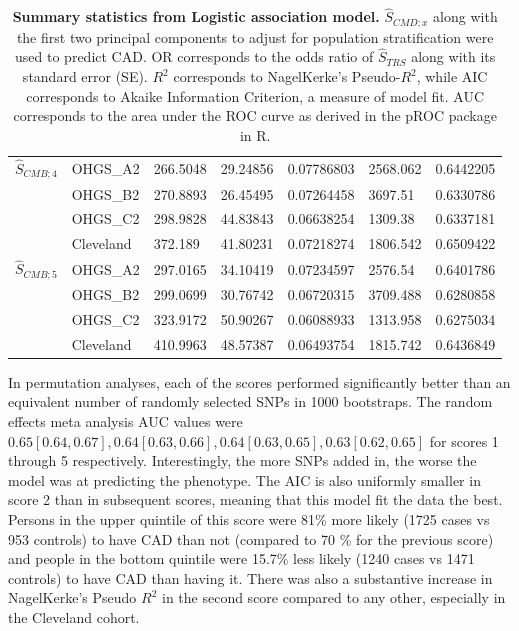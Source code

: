 \begin{table}[H]
\begin{tabular}{lllllll}
$\hat{S}_{CMB; 4}$     & OHGS\_A2         & 266.5048  & 29.24856 & 0.07786803 & 2568.062 & 0.6442205 \\
      & OHGS\_B2         & 270.8893  & 26.45495 & 0.07264458 & 3697.51  & 0.6330786 \\
      & OHGS\_C2         & 298.9828  & 44.83843 & 0.06638254 & 1309.38  & 0.6337181 \\
      & Cleveland        & 372.189   & 41.80231 & 0.07218274 & 1806.542 & 0.6509422 \\ \hline
$\hat{S}_{CMB; 5}$     & OHGS\_A2         & 297.0165  & 34.10419 & 0.07234597 & 2576.54  & 0.6401786 \\
      & OHGS\_B2         & 299.0699  & 30.76742 & 0.06720315 & 3709.488 & 0.6280858 \\
      & OHGS\_C2         & 323.9172  & 50.90267 & 0.06088933 & 1313.958 & 0.6275034 \\
      & Cleveland        & 410.9963  & 48.57387 & 0.06493754 & 1815.742 & 0.6436849 \\ \hline
\end{tabular}
\label{cmd-sum}
\caption[Summary statistics from Logistic association model for $\hat{S}_{CMD}$.]{\textbf{Summary statistics from Logistic association model.} $\hat{S}_{CMD; x}$ along with the first two principal components to adjust for population stratification were used to predict \ac{CAD}. OR corresponds to the odds ratio of $\hat{S}_{TRS}$ along with its standard error (SE). $R^2$ corresponds to NagelKerke's Pseudo-$R^2$, while AIC corresponds to Akaike Information Criterion, a measure of model fit. AUC corresponds to the area under the \ac{ROC} curve as derived in the pROC package in R.}
\end{table}

In permutation analyses, each of the scores performed significantly better than an equivalent number of randomly selected \acp{SNP} in 1000 bootstraps. The random effects meta analysis \ac{AUC} values were $0.65 [ 0.64, 0.67], 0.64[0.63, 0.66], 0.64[0.63, 0.65], 0.63[0.62, 0.65]$ for scores 1 through 5 respectively. Interestingly, the more \acp{SNP} added in, the worse the model was at predicting the phenotype. The \ac{AIC} is also uniformly smaller in score 2 than in subsequent scores, meaning that this model fit the data the best. Persons in the upper quintile of this score were 81\% more likely (1725 cases vs 953 controls) to have \ac{CAD} than not (compared to 70 \% for the previous score) and people in the bottom quintile were 15.7\% less likely (1240 cases vs 1471 controls) to have \ac{CAD} than having it. There was also a substantive increase in NagelKerke's Pseudo $R^2$ in the second score compared to any other, especially in the Cleveland cohort. 

